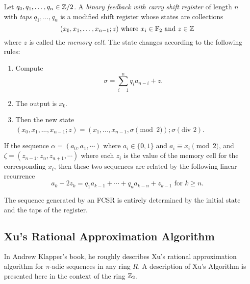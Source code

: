 \begin{definition}\label{afsr}
  Let $q_0,q_1,\dots,q_n\in\mathbb{Z}/2$. A {\em binary feedback with carry shift register} 
  of length $n$ with {\em taps} $q_1,\dots,q_n$ is a modified shift register
  whose states are collections
  \[
	(x_0,x_1,\dots,x_{n-1};z) \text{ where } x_i\in\mathbb{F}_2 \text{ and } z \in \mathbb{Z}
  \]
  where $z$ is called the {\it memory cell}. The state changes according
  to the following rules:
  \begin{enumerate}[1.]
    \item Compute
      \[
      \sigma = \sum^n_{i=1}q_ia_{n-i}+z.
      \]
    \item The output is $x_0$.
    \item Then the new state $(x_0,x_1,\dots,x_{n-1};z)
      =(x_1,\dots,x_{n-1},\sigma\pmod2);\sigma(\text{div }2)$.
  \end{enumerate}
\end{definition}

\begin{lemma}
\par If the sequence $\alpha=(a_0,a_1,\cdots)$ where $a_i\in\{0,1\}$ and
$a_i\equiv x_i\pmod2$, and $\zeta=(z_{n-1},z_n,z_{n+1},\cdots)$ where each
$z_i$ is the value of the memory cell for the corresponding $x_i$, then
these two sequences are related by the following linear recurrence
\begin{equation}\label{eqn:lin-rec}
  a_k+2z_k=q_1a_{k-1}+\cdots+q_na_{k-n}+z_{k-1} \text{ for } k\geq n.
\end{equation}
\end{lemma}

\par The sequence generated by an FCSR is entirely determined by the initial
state and the taps of the register.

\begin{proposition}\label{prop:FCSR-seq}

\end{proposition}

\subsection{Xu's Rational Approximation Algorithm}
\par In Andrew Klapper's book, he roughly describes Xu's rational approximation
algorithm for $\pi$-adic sequences in any ring $R$. A description of Xu's Algorithm
is presented here in the context of the ring $\mathbb{Z}_2$.

